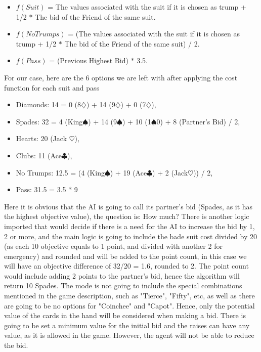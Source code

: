     \begin{itemize}
    \item $f(Suit)$ = The values associated with the suit if it is chosen as trump + 1/2 $*$ The bid of the Friend of the same suit.
    \item $f(NoTrumps)$ = (The values associated with the suit if it is chosen as trump + 1/2 $*$ The bid of the Friend of the same suit) / 2.
    \item $f(Pass)$ = (Previous Highest Bid) $*$ 3.5.
    \end{itemize}

For our case, here are the 6 options we are left with after applying the cost function for each suit and pass
\begin{itemize}
    \item Diamonds:  14 = 0 (8$\diamondsuit$) + 14 (9$\diamondsuit$) + 0 (7$\diamondsuit$),
    \item Spades: 32 = 4 (King$\spadesuit$) + 14 (9$\spadesuit$) + 10 (1$\spadesuit$0) + 8 (Partner’s Bid) / 2,
    \item Hearts: 20 (Jack $\heartsuit$),
    \item Clubs: 11 (Ace$\clubsuit$),
    \item No Trumps: 12.5 = (4 (King$\spadesuit$) + 19 (Ace$\clubsuit$) + 2 (Jack$\heartsuit$)) / 2,
    \item Pass: 31.5 = 3.5 * 9
\end{itemize}

Here it is obvious that the AI
is going to call its partner's bid (Spades, as it has the highest objective value), the question is: How much? There is another logic
imported that would decide if there is a need for the AI to increase the bid by 1, 2 or
more, and the main logic is going to include the bade suit cost divided by 20 (as each 10 objective equals to 1 point, and divided with another 2 for emergency)
and rounded and will be added to the point
count, in this case we will have an objective difference of 32/20 = 1.6, rounded to 2. The point count would include adding 2 points to the partner's bid,
hence the algorithm will return 10 Spades. The mode is not going to include the special combinations mentioned
in the game description, such as "Tierce", "Fifty", etc, as well as there are going to be no options for "Coinchee" and "Capot".
Hence, only the potential value of the cards in the hand will be considered when making a bid.
There is going to be set a minimum value for the initial bid and
the raises can have any value, as it is allowed in the game. However, the agent will not be able to reduce the bid.


